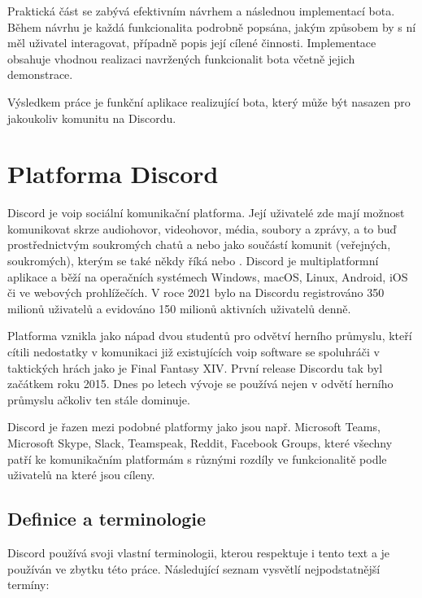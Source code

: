 \documentclass[
  program=inf,
biblatex=false,
sourcecodes=true,
joinlists=true,
  figures=true,
  tables=true,
  glossaries=true,
  index=false
]{kidiplom}
\begin{document}
Praktická část se zabývá efektivním návrhem a následnou implementací bota.
Během návrhu je každá funkcionalita podrobně popsána, jakým způsobem by s ní měl uživatel interagovat, případně popis její cílené činnosti.
Implementace obsahuje vhodnou realizaci navržených funkcionalit bota včetně jejich demonstrace.

Výsledkem práce je funkční aplikace realizující bota, který může být nasazen pro jakoukoliv komunitu na Discordu.
\newpage

\section{Platforma Discord}


Discord je \acrshort{voip} sociální komunikační platforma. Její uživatelé zde mají možnost komunikovat
skrze audiohovor, videohovor, média, soubory a zprávy, a to buď prostřednictvým soukromých chatů
a nebo jako součástí komunit (veřejných, soukromých), kterým se také někdy říká  nebo .
Discord je multiplatformní aplikace a běží na operačních systémech Windows, macOS, Linux, Android, iOS či ve webových prohlížečích.
V roce 2021 bylo na Discordu registrováno 350 milionů uživatelů a evidováno 150 milionů aktivních uživatelů denně.

Platforma vznikla jako nápad dvou studentů pro odvětví herního průmyslu, kteří cítili
nedostatky v komunikaci již existujících \acrshort{voip} software se spoluhráči v taktických hrách jako je Final Fantasy XIV.
\cite{ffxiv}
První release Discordu tak byl začátkem roku 2015. Dnes po letech vývoje se používá nejen 
v odvětí herního průmyslu ačkoliv ten stále dominuje. \cite{dc}

Discord je řazen mezi podobné platformy jako jsou např. Microsoft Teams, Microsoft Skype, 
Slack, Teamspeak, Reddit, Facebook Groups, které všechny patří ke komunikačním platformám
s různými rozdíly ve funkcionalitě podle uživatelů na které jsou cíleny.

\subsection{Definice a terminologie}
Discord používá svoji vlastní terminologii, kterou respektuje i tento text a je
používán ve zbytku této práce. Následující seznam vysvětlí nejpodstatnější termíny:
\end{document}
